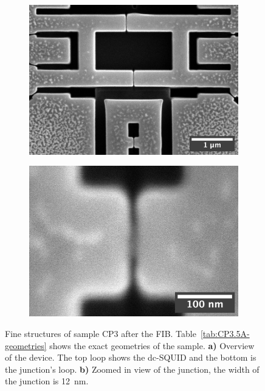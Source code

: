 \begin{figure}[ht!]
	\begin{subfigure}[t]{0.45\textwidth}
		\centering
		\subcaption{}
		\includegraphics[width=\textwidth]{figures/samples/CP3/CP3.5A_SEM_overview.jpg}
	\end{subfigure}
	\hfill
	\begin{subfigure}[t]{0.45\textwidth}
		\centering
		\subcaption{}
		\includegraphics[width=\textwidth]{figures/samples/CP3/CP3.5A_SEM_junction.jpg}
	\end{subfigure}
	
	\caption{Fine structures of sample CP3 after the FIB. Table~\ref{tab:CP3.5A-geometries} shows the exact geometries of the sample. \textbf{a)} Overview of the device. The top loop shows the dc-SQUID and the bottom is the junction's loop. \textbf{b)} Zoomed in view of the junction, the width of the junction is \qty{12}{\nano\meter}.}
	\label{fig:CP3.5A-SEM-images}
\end{figure}

